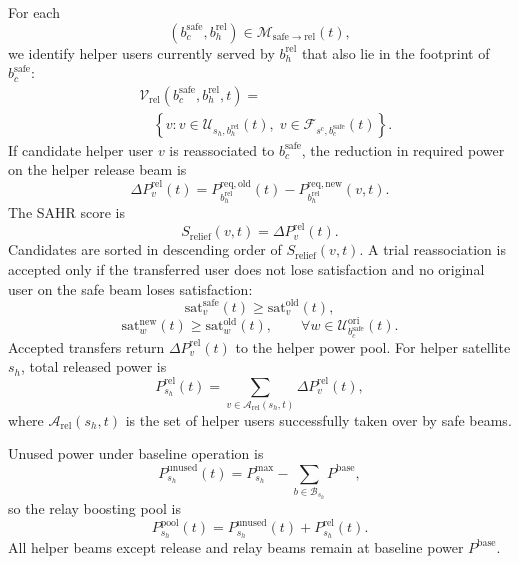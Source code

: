 For each
\begin{equation*}
(b_c^{\mathrm{safe}},b_h^{\mathrm{rel}})\in \mathcal{M}_{\mathrm{safe}\to\mathrm{rel}}(t),
\end{equation*}
we identify helper users currently served by $b_h^{\mathrm{rel}}$ that also lie in the footprint of $b_c^{\mathrm{safe}}$:
\begin{equation*}
\begin{split}
&\mathcal{V}_{\mathrm{rel}}(b_c^{\mathrm{safe}},b_h^{\mathrm{rel}},t)= \\
&\quad
\left\{
v :
v\in\mathcal{U}_{s_h,b_h^{\mathrm{rel}}}(t),\;
v\in\mathcal{F}_{s^{\mathrm{c}},b_c^{\mathrm{safe}}}(t)
\right\}.
\end{split}
\end{equation*}
If candidate helper user $v$ is reassociated to $b_c^{\mathrm{safe}}$, the reduction in required power on the helper release beam is
\begin{equation*}
\Delta P_v^{\mathrm{rel}}(t)=
P_{b_h^{\mathrm{rel}}}^{\mathrm{req,old}}(t)-
P_{b_h^{\mathrm{rel}}}^{\mathrm{req,new}}(v,t).
\end{equation*}
The SAHR score is
\begin{equation*}
S_{\mathrm{relief}}(v,t)=\Delta P_v^{\mathrm{rel}}(t).
\end{equation*}
Candidates are sorted in descending order of $S_{\mathrm{relief}}(v,t)$. A trial reassociation is accepted only if the transferred user does not lose satisfaction and no original user on the safe beam loses satisfaction:
\begin{equation*}
\mathrm{sat}_v^{\mathrm{safe}}(t)\ge \mathrm{sat}_v^{\mathrm{old}}(t),
\end{equation*}
\begin{equation*}
\mathrm{sat}_w^{\mathrm{new}}(t)\ge \mathrm{sat}_w^{\mathrm{old}}(t),
\qquad \forall w\in\mathcal{U}_{b_c^{\mathrm{safe}}}^{\mathrm{ori}}(t).
\end{equation*}
Accepted transfers return $\Delta P_v^{\mathrm{rel}}(t)$ to the helper power pool. For helper satellite $s_h$, total released power is
\begin{equation*}
P_{s_h}^{\mathrm{rel}}(t)=
\sum_{v\in\mathcal{A}_{\mathrm{rel}}(s_h,t)} \Delta P_v^{\mathrm{rel}}(t),
\end{equation*}
where $\mathcal{A}_{\mathrm{rel}}(s_h,t)$ is the set of helper users successfully taken over by safe beams.

Unused power under baseline operation is
\begin{equation*}
P_{s_h}^{\mathrm{unused}}(t)=
P_{s_h}^{\max}-\sum_{b\in\mathcal{B}_{s_h}} P^{\mathrm{base}},
\end{equation*}
so the relay boosting pool is
\begin{equation*}
P_{s_h}^{\mathrm{pool}}(t)=
P_{s_h}^{\mathrm{unused}}(t)+P_{s_h}^{\mathrm{rel}}(t).
\end{equation*}
All helper beams except release and relay beams remain at baseline power $P^{\mathrm{base}}$.

